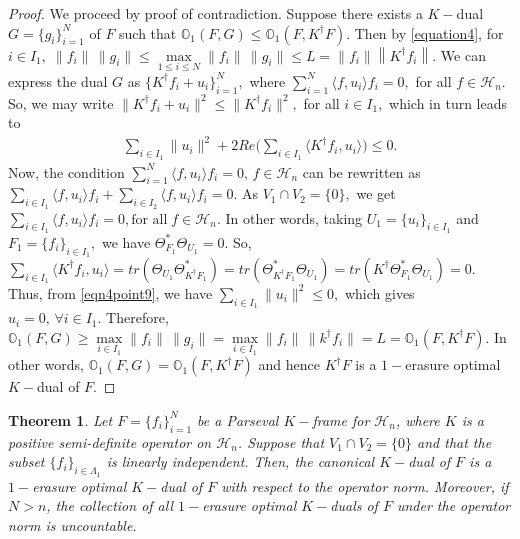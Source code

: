 \documentclass[final,1p,times]{elsarticle}
\newtheorem{thm}{Theorem}[section]
\begin{document}
	\begin{proof}
		We proceed by proof of contradiction. Suppose there exists a $K-$dual $G = \{g_i\}_{i=1}^N $ of $F$  such that  $\mathbb{O}_{1}(F,G) \leq \mathbb{O}_{1} (F, K^\dag F) .$ Then by \eqref{equation4}, for $i \in I_1,\;	 \|f_i \|\,\|g_i \| \leq \max\limits _{1\leq i \leq N} \|f_i \|\,\|g_i \| \leq L =  \|f_i \| \left\| K^\dag f_i \right\| .$ We can express the dual $G$ as $ \{ K^\dag f_i + u_i \}_{i=1}^N ,$  where $\sum\limits_{i=1}^N \langle f,u_i \rangle f_i =0,$ for all $f \in \mathcal{H}_n.$
		So, we may write $\|K^\dag f_i + u_i \|^2 \leq \|K^\dag f_i \|^2,$ for all $i \in I_1,$ which in turn leads to
		\begin{align}\label{eqn4point9}
			\sum_{i \in I_1} \| u_i \|^2 + 2 Re \bigg( \sum_{i \in I_1} \langle  K^\dag f_i ,u_i \rangle \bigg) \leq 0 .
		\end{align}
		Now, the condition $\sum\limits_{i=1}^N  \langle f,u_i \rangle f_i =0,\,f \in \mathcal{H}_n$ can be rewritten as $\sum\limits_{i \in I_1}  \langle f,u_i \rangle f_i + \sum\limits_{i \in I_2}  \langle f,u_i \rangle f_i = 0.$ As $V_1 \cap V_2 = \{0\},$  we get $\sum\limits_{i \in I_1} \langle  f , u_i \rangle f_i = 0, \text{for all} \;f \in \mathcal{H}_n .$ In other words, taking $U_1 = \{ u_i\}_{ i \in I_1}$ and  $F_1 = \{ f_i\}_{ i \in I_1},$ we have  $\Theta_{F_1}^*\Theta_{U_1} = 0.$ So, $\sum\limits_{i \in I_1} \langle  K^\dag f_i ,u_i \rangle =  tr\left(\Theta_{U_1} \Theta_{K^\dag F_1}^*  \right) = tr\left( \Theta_{K^\dag F_1}^*\Theta_{U_1}  \right) = tr \left(K^\dag \Theta_{ F_1}^*\Theta_{U_1}  \right)= 0.$  Thus, from \eqref{eqn4point9}, we have $ \sum\limits_{i \in I_1} \| u_i \|^2 \leq  0,$ which gives $u_i =0,\,\forall i \in I_1.$ Therefore, $\mathbb{O}_{1}(F,G) \geq \max\limits_{i \in I_1}\|f_i \|\,\|g_i \| = \max\limits_{i \in I_1}\|f_i \|\,\|k^\dag f_i \| = L = \mathbb{O}_{1}(F,K^\dag F).$  In other words, $\mathbb{O}_{1}(F,G) = \mathbb{O}_{1}(F,K^\dag F)$ and hence $K^\dag F$ is a $1-$erasure  optimal $K-$dual of $F.$
		
	\end{proof}
	
	

\begin{thm}\label{theorem4point3op}
Let $F = \{f_i\}_{i=1}^N$ be a Parseval $K-$frame for $\mathcal{H}_n$, where $K$ is a positive semi-definite operator on $\mathcal{H}_n$. Suppose that $V_1 \cap V_2 = \{0\}$ and that the subset $\{f_i\}_{i \in \Lambda_1}$ is linearly independent. Then, the canonical $K-$dual of $F$ is a $1-$erasure optimal $K-$dual of $F$ with respect to the operator norm. Moreover, if $N > n$, the collection of all $1-$erasure optimal $K-$duals of $F$ under the operator norm is uncountable.
\end{thm}
\end{document}
